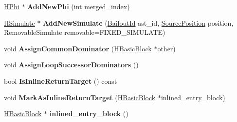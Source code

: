 \begin{DoxyCompactItemize}
\item 
\hyperlink{classv8_1_1internal_1_1_h_phi}{H\+Phi} $\ast$ {\bfseries Add\+New\+Phi} (int merged\+\_\+index)\hypertarget{classv8_1_1internal_1_1_h_basic_block_a1c3504f4fcbb77d1c9429063c898dcaf}{}\label{classv8_1_1internal_1_1_h_basic_block_a1c3504f4fcbb77d1c9429063c898dcaf}

\item 
\hyperlink{classv8_1_1internal_1_1_h_simulate}{H\+Simulate} $\ast$ {\bfseries Add\+New\+Simulate} (\hyperlink{classv8_1_1internal_1_1_bailout_id}{Bailout\+Id} ast\+\_\+id, \hyperlink{classv8_1_1internal_1_1_source_position}{Source\+Position} position, Removable\+Simulate removable=F\+I\+X\+E\+D\+\_\+\+S\+I\+M\+U\+L\+A\+TE)\hypertarget{classv8_1_1internal_1_1_h_basic_block_ac053f0dd303a665676d0cec5ce8a9133}{}\label{classv8_1_1internal_1_1_h_basic_block_ac053f0dd303a665676d0cec5ce8a9133}

\item 
void {\bfseries Assign\+Common\+Dominator} (\hyperlink{classv8_1_1internal_1_1_h_basic_block}{H\+Basic\+Block} $\ast$other)\hypertarget{classv8_1_1internal_1_1_h_basic_block_a00085ec101a33570dea0490483f7d9af}{}\label{classv8_1_1internal_1_1_h_basic_block_a00085ec101a33570dea0490483f7d9af}

\item 
void {\bfseries Assign\+Loop\+Successor\+Dominators} ()\hypertarget{classv8_1_1internal_1_1_h_basic_block_afa277cf2199bee36eefa5a43296fbaf4}{}\label{classv8_1_1internal_1_1_h_basic_block_afa277cf2199bee36eefa5a43296fbaf4}

\item 
bool {\bfseries Is\+Inline\+Return\+Target} () const \hypertarget{classv8_1_1internal_1_1_h_basic_block_a1c9a059704b3b6e5990a6f0004ef5447}{}\label{classv8_1_1internal_1_1_h_basic_block_a1c9a059704b3b6e5990a6f0004ef5447}

\item 
void {\bfseries Mark\+As\+Inline\+Return\+Target} (\hyperlink{classv8_1_1internal_1_1_h_basic_block}{H\+Basic\+Block} $\ast$inlined\+\_\+entry\+\_\+block)\hypertarget{classv8_1_1internal_1_1_h_basic_block_a0954eae1b683f87f914a673be7a6d93d}{}\label{classv8_1_1internal_1_1_h_basic_block_a0954eae1b683f87f914a673be7a6d93d}

\item 
\hyperlink{classv8_1_1internal_1_1_h_basic_block}{H\+Basic\+Block} $\ast$ {\bfseries inlined\+\_\+entry\+\_\+block} ()\hypertarget{classv8_1_1internal_1_1_h_basic_block_a072a366d22298084c9432870d106ff84}{}\label{classv8_1_1internal_1_1_h_basic_block_a072a366d22298084c9432870d106ff84}


\end{DoxyCompactItemize}
